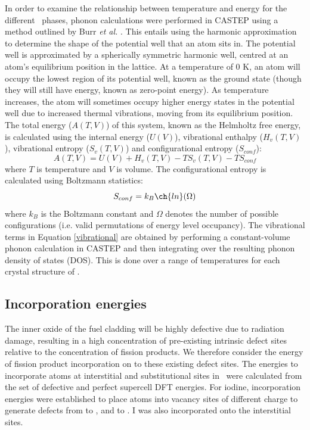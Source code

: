 In order to examine the relationship between temperature and energy for the different \zirconia\ phases, phonon calculations were performed in CASTEP using a method outlined by Burr \emph{et al.} \cite{burr2015crystal,jackson2016resolving}. This entails using the harmonic approximation to determine the shape of the potential well that an atom sits in. The potential well is approximated by a spherically symmetric harmonic well, centred at an atom's equilibrium position in the lattice. At a temperature of 0 K, an atom will occupy the lowest region of its potential well, known as the ground state (though they will still have energy, known as zero-point energy). As temperature increases, the atom will sometimes occupy higher energy states in the potential well due to increased thermal vibrations, moving from its equilibrium position. The total energy ($A(T, V)$) of this system, known as the Helmholtz free energy, is calculated using the internal energy ($U(V)$), vibrational enthalpy ($H_{v}(T, V)$), vibrational entropy ($S_{v}(T, V)$) and configurational entropy ($S_{conf}$):
\begin{equation} \label{vibrational}
A(T, V) = U(V) + H_{v}(T, V) - TS_{v}(T, V) - TS_{conf} 
\end{equation}
where $T$ is temperature and $V$ is volume. The configurational entropy is calculated using Boltzmann statistics:
\begin{equation}
S_{conf} = k_{B}\ch{ln}(\Omega)
\end{equation}
where $k_{B}$ is the Boltzmann constant and $\Omega$ denotes the number of possible configurations (i.e. valid permutations of energy level occupancy). The vibrational terms in Equation \ref{vibrational} are obtained by performing a constant-volume phonon calculation in CASTEP and then integrating over the resulting phonon density of states (DOS). This is done over a range of temperatures for each crystal structure of \zirconia .

\subsection{Incorporation energies}

The inner oxide of the fuel cladding will be highly defective due to radiation damage, resulting in a high concentration of pre-existing intrinsic defect sites relative to the concentration of fission products. We therefore consider the energy of fission product incorporation on to these existing defect sites. The energies to incorporate atoms at interstitial and substitutional sites in \zirconia\ were calculated from the set of defective and perfect supercell DFT energies. For iodine, incorporation energies were established to place atoms into vacancy sites of different charge to generate defects from  to , and  to . I was also incorporated onto the interstitial sites.

